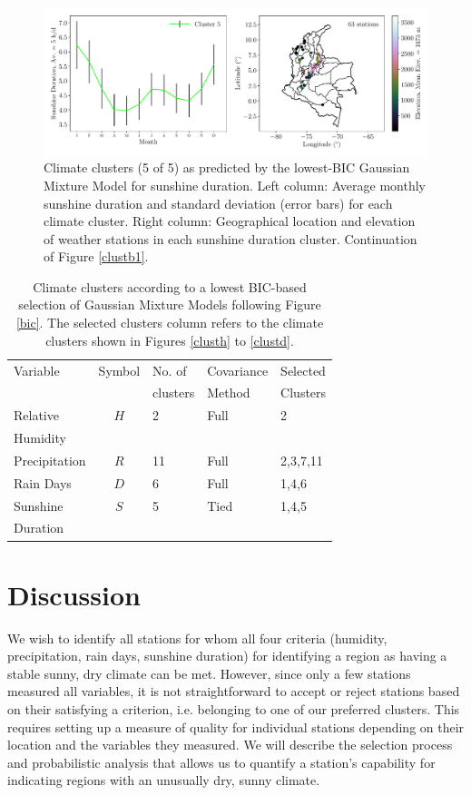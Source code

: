 \documentclass[a4paper,fleqn,usenatbib]{mnras}
\begin{document}
\begin{figure}
\begin{center}

\includegraphics[scale=0.5,trim={0 17 0 18},clip]{gmmb4.pdf}
\caption{Climate clusters (5 of 5) as predicted by the lowest-BIC Gaussian Mixture Model for sunshine duration. Left column: Average monthly sunshine duration and standard deviation (error bars) for each climate cluster. Right column: Geographical location and elevation of weather stations in each sunshine duration cluster. Continuation of Figure \ref{clustb1}.}\label{clustb}
\end{center}
\end{figure}


\begin{table}
\caption{\label{tabclu}Climate clusters according to a lowest BIC-based selection of Gaussian Mixture Models following Figure \ref{bic}. The selected clusters column refers to the climate clusters shown in Figures \ref{clusth} to \ref{clustd}. }
\begin{tabular}{@{}lclll}
\midrule
Variable&Symbol& No. of&Covariance&Selected \\
&&clusters&Method &Clusters\\
\midrule
Relative &$H$&2&Full&2\\
Humidity&&&&\\
\midrule
Precipitation &$R$&11&Full&2,3,7,11\\
\midrule
Rain Days&$D$&6&Full&1,4,6\\
\midrule
Sunshine &$S$&5&Tied&1,4,5\\
Duration&&&&\\
\bottomrule
\end{tabular}
\end{table}

\section{Discussion}

We wish to identify all stations for whom all four criteria (humidity, precipitation, rain days, sunshine duration) for identifying a region as having a stable sunny, dry climate can be met.  However, since only a few stations measured all variables, it is not straightforward to accept or reject stations based on their satisfying a criterion, i.e. belonging to one of our preferred clusters. This requires setting up a measure of quality for individual stations depending on their location and the variables they measured. We will describe the selection process and probabilistic analysis that allows us to quantify a station's capability for indicating regions with an unusually dry, sunny climate.\\
\end{document}
